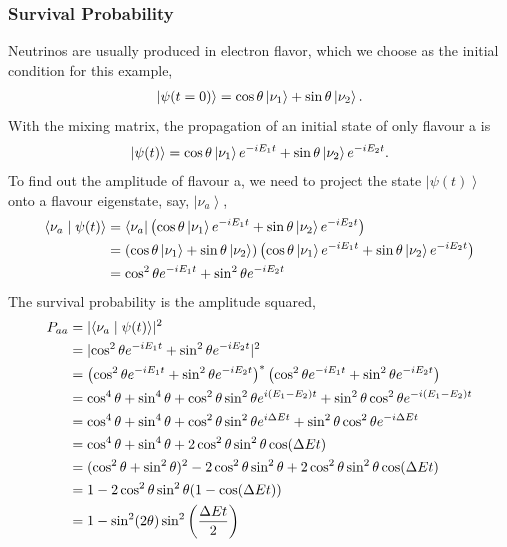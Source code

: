 \documentclass[letterpaper,12pt,english]{sphinxmanual}
\newcommand{\bra}[1]{\left\langle #1\right|}
\newcommand{\ket}[1]{\left| #1\right\rangle}
\newcommand{\braket}[2]{\langle #1 \mid #2 \rangle}
\begin{document}
\subsubsection{Survival Probability}
\label{oscillations:survival-probability}
Neutrinos are usually produced in electron flavor, which we choose as the initial condition for this example,
\begin{gather}
\begin{split}\ket{\psi(t=0)} = \cos\theta \ket{\nu_1} + \sin \theta \ket{\nu_2}.\end{split}\notag
\end{gather}
With the mixing matrix, the propagation of an initial state of only flavour a is
\begin{gather}
\begin{split}\ket{\psi(t)} = \cos\theta \ket{\nu_1} e^{-i E_1 t} + \sin\theta \ket{\nu_2} e^{-i E_2 t} .\end{split}\notag
\end{gather}
To find out the amplitude of flavour a, we need to project the state \(\ket{\psi(t)}\) onto a flavour eigenstate, say, \(\ket{\nu_a}\),
\begin{gather}
\begin{split}\braket{\nu_a}{\psi(t)} & = \bra{\nu_a}\left( \cos\theta \ket{\nu_1} e^{-i E_1 t} + \sin\theta \ket{\nu_2} e^{-i E_2 t}\right) \\
&= \left( \cos\theta \ket{\nu_1}  + \sin\theta \ket{\nu_2} \right) \left( \cos\theta \ket{\nu_1} e^{-i E_1 t} + \sin\theta \ket{\nu_2} e^{-i E_2 t}\right) \\
& = \cos^2\theta e^{-iE_1t} + \sin^2\theta e^{-i E_2 t}\end{split}\notag
\end{gather}
The survival probability is the amplitude squared,
\begin{gather}
\begin{split}P_{aa} & = \lvert \braket{\nu_a}{\psi(t)} \rvert ^2 \\
& = \lvert \cos^2\theta e^{-iE_1t} + \sin^2\theta e^{-i E_2 t}  \rvert^2 \\
& = \left( \cos^2\theta e^{-iE_1t} + \sin^2\theta e^{-i E_2 t}  \right)^* \left( \cos^2\theta e^{-iE_1t} + \sin^2\theta e^{-i E_2 t}  \right) \\
& = \cos^4\theta + \sin^4\theta + \cos^2\theta\sin^2\theta e^{i(E_1-E_2)t}+ \sin^2\theta\cos^2\theta e^{-i(E_1-E_2)t} \\
& = \cos^4\theta + \sin^4\theta + \cos^2\theta\sin^2\theta e^{i\Delta E t}+ \sin^2\theta\cos^2\theta e^{-i\Delta E t} \\
& = \cos^4\theta + \sin^4\theta + 2 \cos^2\theta\sin^2\theta \cos(\Delta E t) \\
& = (\cos^2\theta +\sin^2\theta)^2 - 2\cos^2\theta \sin^2\theta  + 2 \cos^2\theta\sin^2\theta \cos(\Delta E t) \\
& = 1 - 2 \cos^2\theta \sin^2\theta (1 - \cos(\Delta E t)) \\
& = 1 - \sin^2(2\theta) \sin^2\left( \frac{\Delta E t}{2} \right)\end{split}\notag
\end{gather}
\end{document}

